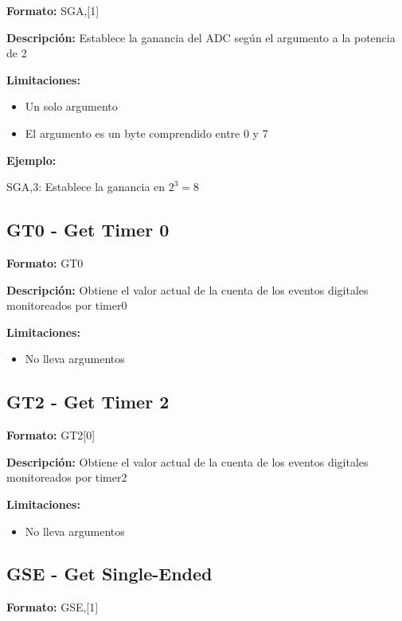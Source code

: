 \textbf{Formato:} SGA,[1]

\textbf{Descripción:}
Establece la ganancia del ADC según el argumento a la potencia de 2

\textbf{Limitaciones:}
\begin{itemize}
  \item Un solo argumento
  \item El argumento es un byte comprendido entre 0 y 7
\end{itemize}

\textbf{Ejemplo:}

SGA,3: Establece la ganancia en $2^{3} = 8$


\subsection{GT0 - Get Timer 0} %
\label{sub:gt0_get_timer_0}


\textbf{Formato:} GT0

\textbf{Descripción:}
Obtiene el valor actual de la cuenta de los eventos digitales monitoreados por timer0

\textbf{Limitaciones:}
\begin{itemize}
  \item No lleva argumentos
\end{itemize}


\subsection{GT2 - Get Timer 2} %
\label{sub:gt2_get_timer_2}

\textbf{Formato:} GT2[0]

\textbf{Descripción:}
Obtiene el valor actual de la cuenta de los eventos digitales monitoreados por timer2

\textbf{Limitaciones:}
\begin{itemize}
  \item No lleva argumentos
\end{itemize}


\subsection{GSE - Get Single-Ended} %
\label{sub:gse_get_single_ended}
\textbf{Formato:} GSE,[1]

